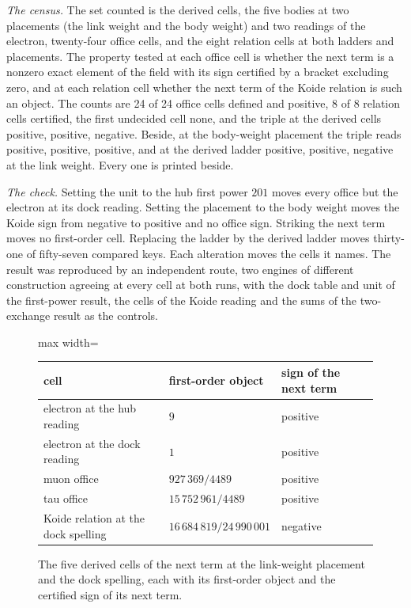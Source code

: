 \begin{chproof}
\textit{The census.} The set counted is the derived cells, the five bodies at two placements (the link weight and the body weight) and two readings of the electron, twenty-four office cells, and the eight relation cells at both ladders and placements. The property tested at each office cell is whether the next term is a nonzero exact element of the field with its sign certified by a bracket excluding zero, and at each relation cell whether the next term of the Koide relation is such an object. The counts are 24 of 24 office cells defined and positive, 8 of 8 relation cells certified, the first undecided cell none, and the triple at the derived cells positive, positive, negative. Beside, at the body-weight placement the triple reads positive, positive, positive, and at the derived ladder positive, positive, negative at the link weight. Every one is printed beside.

\textit{The check.} Setting the unit to the hub first power $201$ moves every office but the electron at its dock reading. Setting the placement to the body weight moves the Koide sign from negative to positive and no office sign. Striking the next term moves no first-order cell. Replacing the ladder by the derived ladder moves thirty-one of fifty-seven compared keys. Each alteration moves the cells it names. The result was reproduced by an independent route, two engines of different construction agreeing at every cell at both runs, with the dock table and unit of the first-power result, the cells of the Koide reading and the sums of the two-exchange result as the controls.
\end{chproof}
\begin{figure}[h]
\centering
\begin{adjustbox}{max width=\linewidth}\begin{tabular}{lll}
\hline
cell & first-order object & sign of the next term \\
\hline
electron at the hub reading & $9$ & positive \\
electron at the dock reading & $1$ & positive \\
muon office & $927\,369/4489$ & positive \\
tau office & $15\,752\,961/4489$ & positive \\
Koide relation at the dock spelling & $16\,684\,819/24\,990\,001$ & negative \\
\hline
\end{tabular}\end{adjustbox}
\caption{The five derived cells of the next term at the link-weight placement and the dock spelling, each with its first-order object and the certified sign of its next term.}
\end{figure}
\par\medskip{}\label{narr:close:8-3}\par
